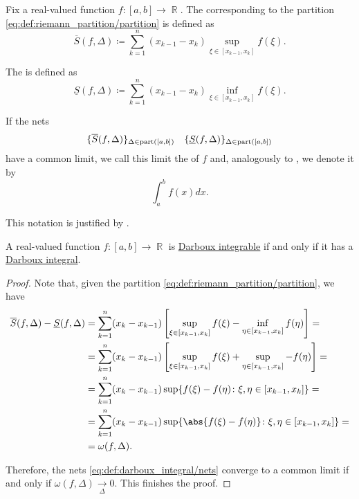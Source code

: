 \begin{definition}\label{def:darboux_integral}
  Fix a real-valued function \( f: [a, b] \to \BbbR \). The  corresponding to the partition \eqref{eq:def:riemann_partition/partition} is defined as
  \begin{equation*}
    \overline{S}(f, \Delta) \coloneqq \sum_{k=1}^n (x_{k-1} - x_k) \sup_{\xi \in [x_{k-1}, x_k]} f(\xi).
  \end{equation*}

  The  is defined as
  \begin{equation*}
    \underline{S}(f, \Delta) \coloneqq \sum_{k=1}^n (x_{k-1} - x_k) \inf_{\xi \in [x_{k-1}, x_k]} f(\xi).
  \end{equation*}

  If the nets
  \begin{align}\label{eq:def:darboux_integral/nets}
    \{ \overline{S}(f, \Delta) \}_{\Delta \in \operatorname{part}([a, b])}
    &&
    \{ \underline{S}(f, \Delta) \}_{\Delta \in \operatorname{part}([a, b])}
  \end{align}
  have a common limit, we call this limit the  of \( f \) and, analogously to , we denote it by
  \begin{equation*}
    \int_a^b f(x) dx.
  \end{equation*}

  This notation is justified by .
\end{definition}

\begin{proposition}\label{thm:darboux_integrable_iff_has_darboux_integral}
  A real-valued function \( f: [a, b] \to \BbbR \) is \hyperref[def:darboux_integrability]{Darboux integrable} if and only if it has a \hyperref[def:darboux_integral]{Darboux integral}.
\end{proposition}
\begin{proof}
  Note that, given the partition \eqref{eq:def:riemann_partition/partition}, we have
  \begin{align*}
    \overline{S}(f, \Delta) - \underline{S}(f, \Delta)
    &=
    \sum_{k=1}^n (x_k - x_{k-1}) \left[ \sup_{\xi \in [x_{k-1}, x_k]} f(\xi) - \inf_{\eta \in [x_{k-1}, x_k]} f(\eta) \right]
    = \\ &=
    \sum_{k=1}^n (x_k - x_{k-1}) \left[ \sup_{\xi \in [x_{k-1}, x_k]} f(\xi) + \sup_{\eta \in [x_{k-1}, x_k]} -f(\eta) \right]
    = \\ &=
    \sum_{k=1}^n (x_k - x_{k-1}) \sup \{ f(\xi) - f(\eta) \colon \xi, \eta \in [x_{k-1}, x_k] \}
    = \\ &=
    \sum_{k=1}^n (x_k - x_{k-1}) \sup \{ \abs{f(\xi) - f(\eta)} \colon \xi, \eta \in [x_{k-1}, x_k] \}
    = \\ &=
    \omega(f, \Delta).
  \end{align*}

  Therefore, the nets \eqref{eq:def:darboux_integral/nets} converge to a common limit if and only if \( \omega(f, \Delta) \xrightarrow[\Delta]{} 0 \). This finishes the proof.
\end{proof}

